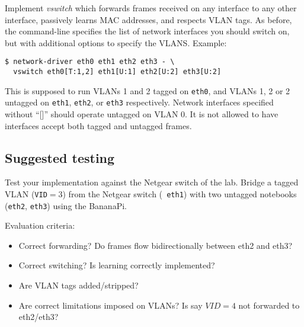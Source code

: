\documentclass{article}
\begin{document}
Implement {\em vswitch} which forwards frames received on any
interface to any other interface, passively learns MAC addresses,
and respects VLAN tags. As before, the command-line specifies the
list of network interfaces you should switch on, but with
additional options to specify the VLANS.  Example:
\begin{verbatim}
$ network-driver eth0 eth1 eth2 eth3 - \
  vswitch eth0[T:1,2] eth1[U:1] eth2[U:2] eth3[U:2]
\end{verbatim}
This is supposed to run VLANs 1 and 2 tagged on {\tt eth0},
and VLANs 1, 2 or 2 untagged on {\tt eth1}, {\tt eth2},
or {\tt eth3} respectively.  Network interfaces specified
without ``[]'' should operate untagged on VLAN 0.  It is
not allowed to have interfaces accept both tagged and
untagged frames.


\subsection{Suggested testing}

Test your implementation against the Netgear switch of the lab.
Bridge a tagged VLAN ({\tt VID}$=3$) from the Netgear switch ({\tt
  eth1}) with two untagged notebooks ({\tt eth2}, {\tt eth3}) using
the BananaPi.

Evaluation criteria:
\begin{itemize}
\item Correct forwarding? Do frames flow bidirectionally between eth2 and eth3?
\item Correct switching? Is learning correctly implemented?
\item Are VLAN tags added/stripped?
\item Are correct limitations imposed on VLANs?
      Is say $VID=4$ not forwarded to eth2/eth3?
\end{itemize}
\end{document}
